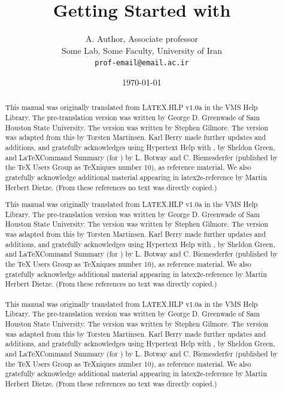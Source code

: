 \documentclass{article}
\begin{document}
	
	\title{Getting Started with \LaTeXe}
	
	\author{A. Author, Associate professor\\ Some Lab, Some Faculty, University of Iran\\ \texttt{prof-email@email.ac.ir}}
	
	\date{\today}
	
	\maketitle
	

\pagebreak

\begin{abstract}
	This manual was originally translated from LATEX.HLP v1.0a in the VMS Help Library.  The pre-translation version was written by George D. Greenwade of Sam Houston State University.  The  version was written by Stephen Gilmore.  The \LaTeXe version was adapted from this by Torsten Martinsen.  Karl Berry made further updates and additions, and gratefully acknowledges using Hypertext Help with \LaTeXe, by Sheldon Green, and \LaTeX Command Summary (for ) by L. Botway and C. Biemesderfer (published by the TeX Users Group as TeXniques number 10), as reference material.  We also gratefully acknowledge additional material appearing in latex2e-reference by Martin Herbert Dietze.  (From these references no text was directly copied.)
	
	This manual was originally translated from LATEX.HLP v1.0a in the VMS Help Library.  The pre-translation version was written by George D. Greenwade of Sam Houston State University.  The  version was written by Stephen Gilmore.  The \LaTeXe version was adapted from this by Torsten Martinsen.  Karl Berry made further updates and additions, and gratefully acknowledges using Hypertext Help with \LaTeXe, by Sheldon Green, and \LaTeX Command Summary (for ) by L. Botway and C. Biemesderfer (published by the TeX Users Group as TeXniques number 10), as reference material.  We also gratefully acknowledge additional material appearing in latex2e-reference by Martin Herbert Dietze.  (From these references no text was directly copied.)
	\\ \\
	This manual was originally translated from LATEX.HLP v1.0a in the VMS Help Library.  The pre-translation version was written by George D. Greenwade of Sam Houston State University.  The  version was written by Stephen Gilmore.  The \LaTeXe version was adapted from this by Torsten Martinsen.  Karl Berry made further updates and additions, and gratefully acknowledges using Hypertext Help with \LaTeXe, by Sheldon Green, and \LaTeX Command Summary (for ) by L. Botway and C. Biemesderfer (published by the TeX Users Group as TeXniques number 10), as reference material.  We also gratefully acknowledge additional material appearing in latex2e-reference by Martin Herbert Dietze.  (From these references no text was directly copied.)
	
\end{abstract}

	
\end{document}
